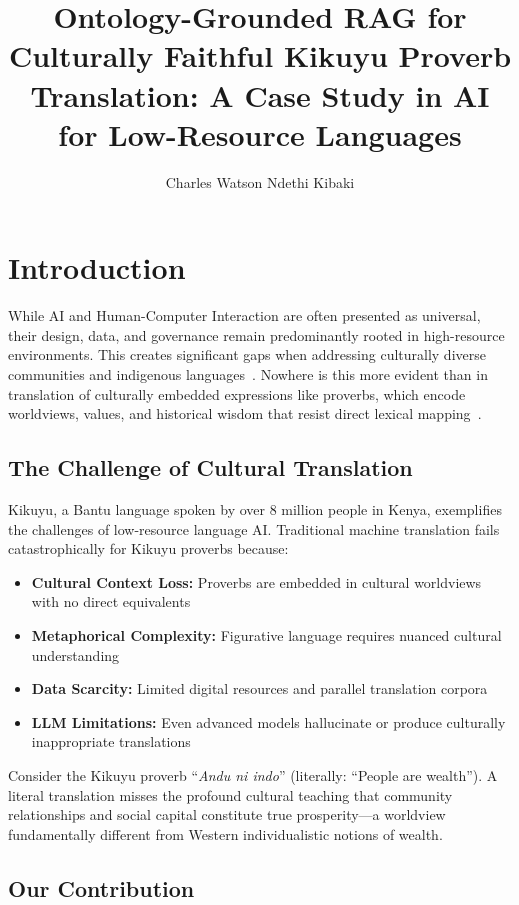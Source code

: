 \documentclass[sigconf,nonacm]{acmart}
\title{Ontology-Grounded RAG for Culturally Faithful Kikuyu Proverb Translation: A Case Study in AI for Low-Resource Languages}
\author{Charles Watson Ndethi Kibaki}
\affiliation{%
  \institution{Open Institute of Technology (OPIT)}
  \city{St. Julian's}
  \country{Malta}
}
\begin{document}
\maketitle

\section{Introduction}

While AI and Human-Computer Interaction are often presented as universal, their design, data, and governance remain predominantly rooted in high-resource environments. This creates significant gaps when addressing culturally diverse communities and indigenous languages~\cite{bird2020decolonising}. Nowhere is this more evident than in translation of culturally embedded expressions like proverbs, which encode worldviews, values, and historical wisdom that resist direct lexical mapping~\cite{finnegan2012oral}.

\subsection{The Challenge of Cultural Translation}

Kikuyu, a Bantu language spoken by over 8 million people in Kenya, exemplifies the challenges of low-resource language AI. Traditional machine translation fails catastrophically for Kikuyu proverbs because:

\begin{itemize}
    \item \textbf{Cultural Context Loss:} Proverbs are embedded in cultural worldviews with no direct equivalents
    \item \textbf{Metaphorical Complexity:} Figurative language requires nuanced cultural understanding
    \item \textbf{Data Scarcity:} Limited digital resources and parallel translation corpora
    \item \textbf{LLM Limitations:} Even advanced models hallucinate or produce culturally inappropriate translations
\end{itemize}

Consider the Kikuyu proverb ``\textit{Andu ni indo}'' (literally: ``People are wealth''). A literal translation misses the profound cultural teaching that community relationships and social capital constitute true prosperity---a worldview fundamentally different from Western individualistic notions of wealth.

\subsection{Our Contribution}
\end{document}
